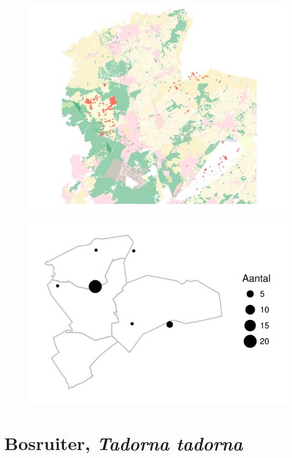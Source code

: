 \documentclass[11pt]{book}
\begin{document}
\begin{multicols}{2}
  
\lipsum[1]

 \begin{figure}[H]
  \includegraphics{Waarnemingen/Bergeend.pdf}
  \end{figure}
  
 \begin{figure}[H]
  \includegraphics{Atlas/Bergeend.pdf}
  \end{figure}
  
\lipsum[1]

\end{multicols}



\chapter{Bosruiter, \itshape Tadorna tadorna}
\end{document}
